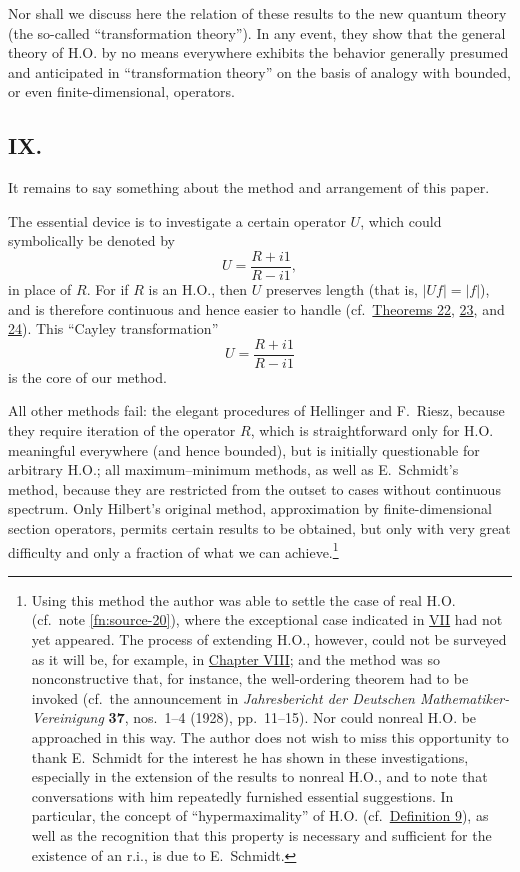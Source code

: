 ﻿\documentclass[paper=b5,fontsize=13pt,bookmarkpackage=false,twoside]{scrartcl}
\begin{document}
Nor shall we discuss here the relation of these results to the new quantum theory (the so-called ``transformation theory''). In any event, they show that the general theory of H.O. by no means everywhere exhibits the behavior generally presumed and anticipated in ``transformation theory'' on the basis of analogy with bounded, or even finite-dimensional, operators.

\subsection*{IX.}\label{intro:IX}

It remains to say something about the method and arrangement of this paper.

The essential device is to investigate a certain operator $U$, which could symbolically be denoted by
\[
 U=\frac{R+i1}{R-i1},
\]
in place of $R$. For if $R$ is an H.O., then $U$ preserves length (that is, $|Uf|=|f|$), and is therefore continuous and hence easier to handle (cf.\ \hyperref[thm:22]{Theorems 22}, \hyperref[thm:23]{23}, and \hyperref[thm:24]{24}). This ``Cayley transformation''
\[
 U=\frac{R+i1}{R-i1}
\]
is the core of our method.

All other methods fail: the elegant procedures of Hellinger and F.~Riesz, because they require iteration of the operator $R$, which is straightforward only for H.O. meaningful everywhere (and hence bounded), but is initially questionable for arbitrary H.O.; all maximum--minimum methods, as well as E.~Schmidt's method, because they are restricted from the outset to cases without continuous spectrum. Only Hilbert's original method, approximation by finite-dimensional section operators, permits certain results to be obtained, but only with very great difficulty and only a fraction of what we can achieve.\footnote{\label{fn:source-23}Using this method the author was able to settle the case of real H.O. (cf.\ note \ref{fn:source-20}), where the exceptional case indicated in \hyperref[intro:VII]{VII} had not yet appeared. The process of extending H.O., however, could not be surveyed as it will be, for example, in \hyperref[chap:VIII]{Chapter VIII}; and the method was so nonconstructive that, for instance, the well-ordering theorem had to be invoked (cf.\ the announcement in \emph{Jahresbericht der Deutschen Mathematiker-Vereinigung} \textbf{37}, nos.~1--4 (1928), pp.~11--15). Nor could nonreal H.O. be approached in this way. The author does not wish to miss this opportunity to thank E.~Schmidt for the interest he has shown in these investigations, especially in the extension of the results to nonreal H.O., and to note that conversations with him repeatedly furnished essential suggestions. In particular, the concept of ``hypermaximality'' of H.O. (cf.\ \hyperref[def:9]{Definition 9}), as well as the recognition that this property is necessary and sufficient for the existence of an r.i., is due to E.~Schmidt.}
\end{document}
